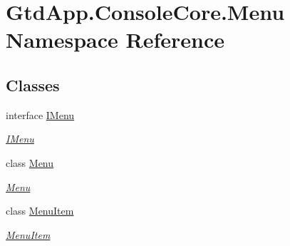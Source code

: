 \hypertarget{namespace_gtd_app_1_1_console_core_1_1_menu}{}\section{Gtd\+App.\+Console\+Core.\+Menu Namespace Reference}
\label{namespace_gtd_app_1_1_console_core_1_1_menu}
\subsection*{Classes}
\begin{DoxyCompactItemize}
\item 
interface \mbox{\hyperlink{interface_gtd_app_1_1_console_core_1_1_menu_1_1_i_menu}{I\+Menu}}
\begin{DoxyCompactList}\small\item\em \mbox{\hyperlink{interface_gtd_app_1_1_console_core_1_1_menu_1_1_i_menu}{I\+Menu}} \end{DoxyCompactList}\item 
class \mbox{\hyperlink{class_gtd_app_1_1_console_core_1_1_menu_1_1_menu}{Menu}}
\begin{DoxyCompactList}\small\item\em \mbox{\hyperlink{class_gtd_app_1_1_console_core_1_1_menu_1_1_menu}{Menu}} \end{DoxyCompactList}\item 
class \mbox{\hyperlink{class_gtd_app_1_1_console_core_1_1_menu_1_1_menu_item}{Menu\+Item}}
\begin{DoxyCompactList}\small\item\em \mbox{\hyperlink{class_gtd_app_1_1_console_core_1_1_menu_1_1_menu_item}{Menu\+Item}} \end{DoxyCompactList}\end{DoxyCompactItemize}
